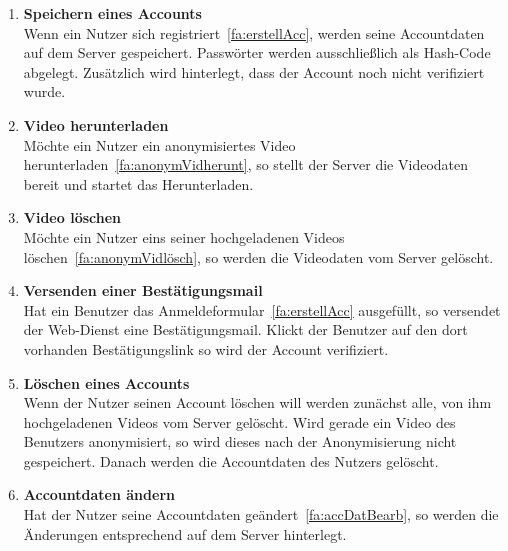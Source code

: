 \begin{enumerate}
\item \label{fa:accSpeichern}\textbf{Speichern eines Accounts} \hfill \\
Wenn ein Nutzer sich registriert~\eqref{fa:erstellAcc}, werden seine Accountdaten auf dem Server gespeichert. Passwörter werden ausschließlich als \gls{Hash-Code} abgelegt. Zusätzlich wird hinterlegt, dass der Account noch nicht verifiziert wurde.

\item \label{fa:vidHerunterladen}\textbf{Video herunterladen} \hfill \\
Möchte ein Nutzer ein anonymisiertes Video herunterladen~\eqref{fa:anonymVidherunt}, so stellt der Server die Videodaten bereit und startet das Herunterladen.

\item \label{fa:vidLöschen}\textbf{Video löschen} \hfill \\
Möchte ein Nutzer eins seiner hochgeladenen Videos löschen~\eqref{fa:anonymVidlösch}, so werden die Videodaten vom Server gelöscht.

\item \label{fa:mailSenden}\textbf{Versenden einer Bestätigungsmail} \hfill \\
Hat ein Benutzer das Anmeldeformular~\eqref{fa:erstellAcc} ausgefüllt, so versendet der \gls{Web-Dienst} eine Bestätigungsmail. Klickt der Benutzer auf den dort vorhanden Bestätigungslink so wird der Account verifiziert.

\item \label{fa:accLöschen}\textbf{Löschen eines Accounts} \hfill \\
Wenn der Nutzer seinen Account löschen will werden zunächst alle, von ihm hochgeladenen Videos vom Server gelöscht. Wird gerade ein Video des Benutzers anonymisiert, so wird dieses nach der Anonymisierung nicht gespeichert. Danach werden die Accountdaten des Nutzers gelöscht.

\item \label{fa:accÄndern}\textbf{Accountdaten ändern} \hfill \\
Hat der Nutzer seine Accountdaten geändert~\eqref{fa:accDatBearb}, so werden die Änderungen entsprechend auf dem Server hinterlegt.

\end{enumerate}





